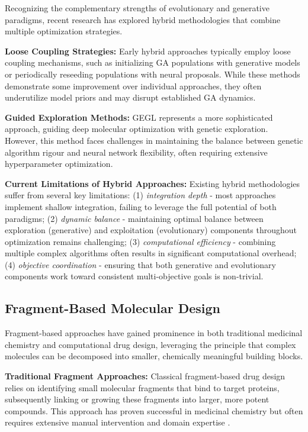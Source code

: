 \documentclass[lettersize,journal]{IEEEtran}
\begin{document}
Recognizing the complementary strengths of evolutionary and generative paradigms, recent research has explored hybrid methodologies that combine multiple optimization strategies.

\noindent \textbf{Loose Coupling Strategies:} Early hybrid approaches typically employ loose coupling mechanisms, such as initializing GA populations with generative models or periodically reseeding populations with neural proposals. While these methods demonstrate some improvement over individual approaches, they often underutilize model priors and may disrupt established GA dynamics.

\noindent \textbf{Guided Exploration Methods:} GEGL \cite{ahnGuidingDeepMolecular2020} represents a more sophisticated approach, guiding deep molecular optimization with genetic exploration. However, this method faces challenges in maintaining the balance between genetic algorithm rigour and neural network flexibility, often requiring extensive hyperparameter optimization.

\noindent \textbf{Current Limitations of Hybrid Approaches:} Existing hybrid methodologies suffer from several key limitations: (1) \textit{integration depth} - most approaches implement shallow integration, failing to leverage the full potential of both paradigms; (2) \textit{dynamic balance} - maintaining optimal balance between exploration (generative) and exploitation (evolutionary) components throughout optimization remains challenging; (3) \textit{computational efficiency} - combining multiple complex algorithms often results in significant computational overhead; (4) \textit{objective coordination} - ensuring that both generative and evolutionary components work toward consistent multi-objective goals is non-trivial.

\subsection{Fragment-Based Molecular Design}

Fragment-based approaches have gained prominence in both traditional medicinal chemistry and computational drug design, leveraging the principle that complex molecules can be decomposed into smaller, chemically meaningful building blocks.

\noindent \textbf{Traditional Fragment Approaches:} Classical fragment-based drug design relies on identifying small molecular fragments that bind to target proteins, subsequently linking or growing these fragments into larger, more potent compounds. This approach has proven successful in medicinal chemistry but often requires extensive manual intervention and domain expertise \cite{yooPartWholeAIdriven2025}.
\end{document}
